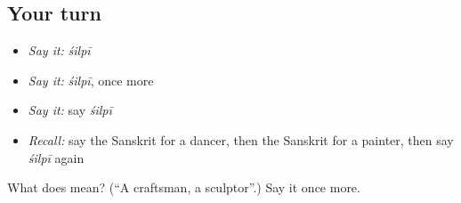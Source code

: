 \subsection*{Your turn}
\begin{itemize}
\raggedright
  \item \emph{Say it:} \emph{śilpī}
  \item \emph{Say it:} \emph{śilpī}, once more
  \item \emph{Say it:} say \emph{śilpī}
  \item \emph{Recall:} say the Sanskrit for a dancer, then the Sanskrit for a painter, then say \emph{śilpī} again
\end{itemize}

\begin{tcolorbox}[breakable,colback=teal!4,colframe=teal!35!black,title={Before you move on}]
What does  mean? (\textquotedblleft{}A craftsman, a sculptor\textquotedblright{}.) Say it once more.
\end{tcolorbox}
